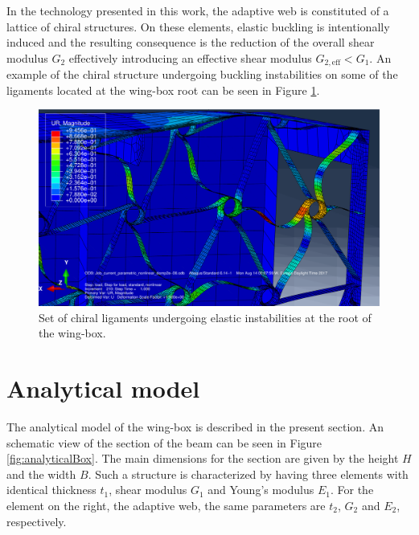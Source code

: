   In the technology presented in this work, the adaptive web is constituted of a lattice of chiral structures. On these elements, elastic buckling is intentionally induced and the resulting consequence is the reduction of the overall shear modulus $G_2$ effectively introducing an effective shear modulus $G_{2,\mathrm{eff}} < G_1$. An example of the chiral structure undergoing buckling instabilities on some of the ligaments located at the wing-box root can be seen in Figure \ref{fig:exampleBuckling}.

  \begin{figure}[!htpb]
    \centering
    \includegraphics[width=0.7 \textwidth]{figures/model/exampleBuckling}
    \caption[Set of chiral ligaments undergoing elastic instabilities at the root of the wing-box]{Set of chiral ligaments undergoing elastic instabilities at the root of the wing-box.}\label{fig:exampleBuckling}
  \end{figure}

\section{Analytical model} \label{sec:analytical_Model}

  The analytical model of the wing-box is described in the present section. An schematic view of the section of the beam can be seen in Figure \ref{fig:analyticalBox}. The main dimensions for the section are given by the height $H$ and the width $B$. Such a structure is characterized by having three elements with identical thickness $t_1$, shear modulus $G_1$ and Young's modulus $E_1$. For the element on the right, the adaptive web, the same parameters are $t_2$, $G_2$ and $E_2$, respectively. 

